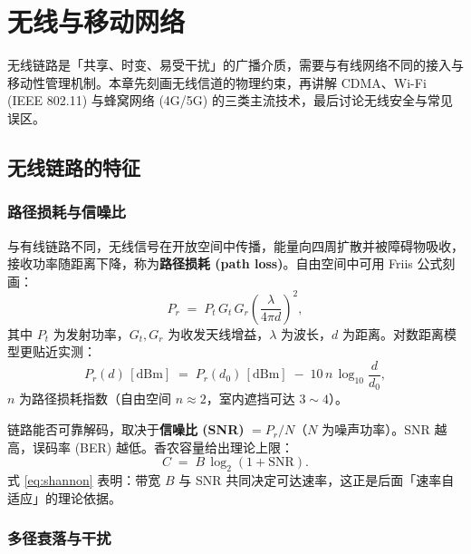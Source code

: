 \clearpage
\begingroup
\let\clearpage\relax
\let\cleardoublepage\relax
\vspace*{\fill}
\chapter{无线与移动网络}
\begin{center}
无线链路是「共享、时变、易受干扰」的广播介质，需要与有线网络不同的接入与移动性管理机制。本章先刻画无线信道的物理约束，再讲解 CDMA、Wi-Fi (IEEE 802.11) 与蜂窝网络 (4G/5G) 的三类主流技术，最后讨论无线安全与常见误区。
\end{center}
\vspace*{\fill}
\endgroup
\clearpage

\section{无线链路的特征}

\subsection{路径损耗与信噪比}

与有线链路不同，无线信号在开放空间中传播，能量向四周扩散并被障碍物吸收，接收功率随距离下降，称为\textbf{路径损耗 (path loss)}。自由空间中可用 Friis 公式刻画：
\begin{equation}
    P_r \;=\; P_t\,G_t\,G_r\left(\frac{\lambda}{4\pi d}\right)^{2},
    \label{eq:friis}
\end{equation}
其中 $P_t$ 为发射功率，$G_t,G_r$ 为收发天线增益，$\lambda$ 为波长，$d$ 为距离。对数距离模型更贴近实测：
\begin{equation}
    P_r(d)\,[\mathrm{dBm}] \;=\; P_r(d_0)\,[\mathrm{dBm}] \;-\; 10\,n\,\log_{10}\!\frac{d}{d_0},
    \label{eq:logdistance}
\end{equation}
$n$ 为路径损耗指数（自由空间 $n\approx2$，室内遮挡可达 $3\sim4$）。

链路能否可靠解码，取决于\textbf{信噪比 (SNR)} $= P_r / N$（$N$ 为噪声功率）。SNR 越高，误码率 (BER) 越低。香农容量给出理论上限：
\begin{equation}
    C \;=\; B\,\log_2\!\left(1+\mathrm{SNR}\right).
    \label{eq:shannon}
\end{equation}
式 \eqref{eq:shannon} 表明：带宽 $B$ 与 SNR 共同决定可达速率，这正是后面「速率自适应」的理论依据。

\subsection{多径衰落与干扰}

